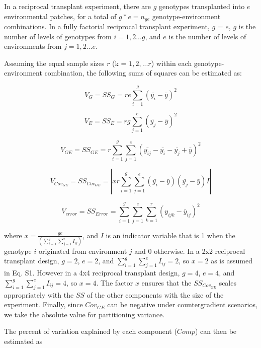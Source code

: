\documentclass[11pt, oneside]{amsart}
\begin{document}
In a reciprocal transplant experiment, there are $g$ genotypes transplanted into $e$ environmental patches, for a total of $g*e = n_{ge}$ genotype-environment combinations. In a fully factorial reciprocal transplant experiment, $g$ = $e$, $g$ is the number of levels of genotypes from $i = 1,2... g$, and $e$ is the number of levels of environments from $j = 1,2... e$.

Assuming the equal sample sizes $r$ (k = $1, 2, ...r$) within each genotype-environment combination, the following sums of squares can be estimated as:

\begin{equation}
V_G = SS_G = re\sum_{i=1}^g (\bar{y_i} - \bar{y})^2
\end{equation}

\begin{equation}
V_E = SS_E =  rg\sum_{j=1}^e (\bar{y_j} - \bar{y})^2 
\end{equation}

\begin{equation}
V_{GE} = SS_{GE} = r \sum_{i=1}^g \sum_{j=1}^e (\bar{y_{ij}} - \bar{y_i} - \bar{y_j} + \bar{y})^2
\end{equation}

\begin{equation}
V_{Cov_{GE}}= SS_{Cov_{GE}} = | xr \sum_{i=1}^g\sum_{j=1}^e(\bar{y_i} - \bar{y})(\bar{y_j} - \bar{y})I |
\end{equation}

\begin{equation}
V_{error} = SS_{Error} = \sum_{i=1}^g \sum_{j=1}^e \sum_{k=1}^r (y_{ijk}-\bar{y}_{ij})^2
\end{equation}

where $x = \frac{ge}{(\sum_{i=1}^g\sum_{j=1}^e I_{ij})}$, and $I$ is an indicator variable that is 1 when the genotype $i$ originated from environment $j$ and 0 otherwise. In a 2x2 reciprocal transplant design, $g=2$, $e=2$, and $\sum_{i=1}^g\sum_{j=1}^e I_{ij}=2$, so $x = 2$ as is assumed in Eq. S1. However in a 4x4 reciprocal transplant design, $g=4$, $e=4$, and $\sum_{i=1}^g\sum_{j=1}^e I_{ij}=4$, so $x = 4$. The factor $x$ ensures that the $SS_{Cov_{GE}}$ scales appropriately with the $SS$ of the other components with the size of the experiment. Finally, since $Cov_{GE}$ can be negative under countergradient scenarios, we take the absolute value for partitioning variance.

The percent of variation explained by each component ($Comp$) can then be estimated as
\end{document}
